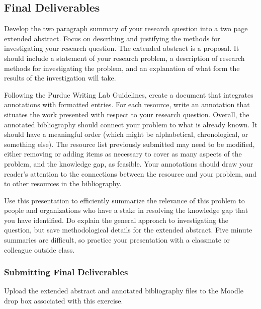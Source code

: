 \documentclass[]{article}
\providecommand{\tightlist}{%
  \setlength{\itemsep}{0pt}\setlength{\parskip}{0pt}}
\begin{document}
\subsection{Final Deliverables}\label{final-deliverables}

\begin{description}
\tightlist
\item[Due October 27 Two page extended abstract]
Develop the two paragraph summary of your research question into a two
page extended abstract. Focus on describing and justifying the methods
for investigating your research question. The extended abstract is a
proposal. It should include a statement of your research problem, a
description of research methods for investigating the problem, and an
explanation of what form the results of the investigation will take.
\item[Due October 27 Annotated bibliography of 20 items]
Following the Purdue Writing Lab Guidelines, create a document that
integrates annotations with formatted entries. For each resource, write
an annotation that situates the work presented with respect to your
research question. Overall, the annotated bibliography should connect
your problem to what is already known. It should have a meaningful order
(which might be alphabetical, chronological, or something else). The
resource list previously submitted may need to be modified, either
removing or adding items as necessary to cover as many aspects of the
problem, and the knowledge gap, as feasible. Your annotations should
draw your reader's attention to the connections between the resource and
your problem, and to other resources in the bibliography.
\item[Due October 27 Five minute oral presentation]
Use this presentation to efficiently summarize the relevance of this
problem to people and organizations who have a stake in resolving the
knowledge gap that you have identified. Do explain the general approach
to investigating the question, but save methodological details for the
extended abstract. Five minute summaries are difficult, so practice your
presentation with a classmate or colleague outside class.
\end{description}

\subsubsection{Submitting Final
Deliverables}\label{submitting-final-deliverables}

Upload the extended abstract and annotated bibliography files to the
Moodle drop box associated with this exercise.
\end{document}
